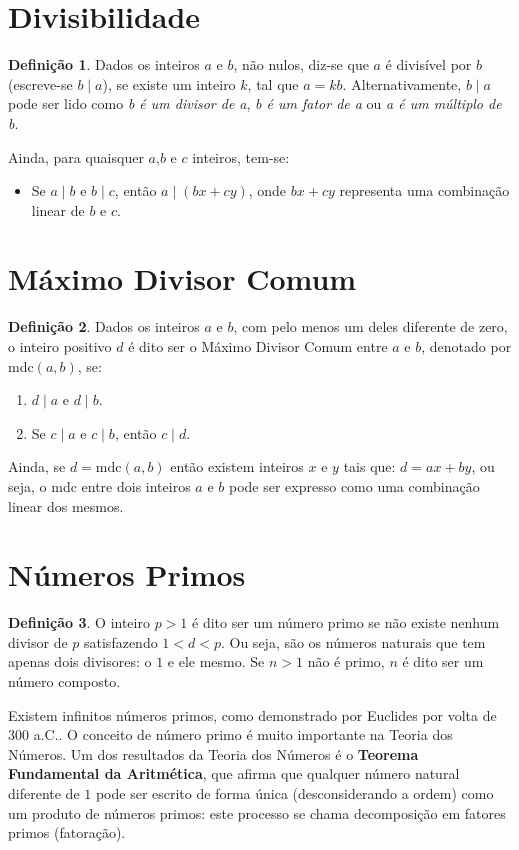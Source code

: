 \documentclass[14pt, oneside]{book}
\newcommand\tab[1][1cm]{\hspace*{#1}}
\theoremstyle{definition}
\newtheorem{defn}{Definição}
\begin{document}
            \section{Divisibilidade}
                \begin{defn}Dados os inteiros $a$ e $b$, não nulos, diz-se que $a$ é divisível por $b$ (escreve-se $b\mid a$), se existe um inteiro $k$, tal que $a = kb$. Alternativamente, $b\mid a$ pode ser lido como \textit{b é um divisor de a}, \textit{b é um fator de a} ou \textit{a é um múltiplo de b}.
                \end{defn}
                \tab Ainda, para quaisquer $a$,$b$ e $c$ inteiros, tem-se:
                \begin{itemize}
                    \item Se $a\mid b$ e $b\mid c$, então $a\mid (bx + cy)$, onde $bx + cy$ representa uma combinação linear de $b$ e $c$.
                \end{itemize}
                    
            \section{Máximo Divisor Comum}
                \begin{defn}Dados os inteiros $a$ e $b$, com pelo menos um deles diferente de zero, o inteiro positivo $d$ é dito ser o Máximo Divisor Comum entre $a$ e $b$, denotado por mdc$(a,b)$, se:
                \begin{enumerate}[label=(\roman*)]
                    \item $d\mid a$ e $d\mid b$.
                    \item Se $c\mid a$ e $c\mid b$, então $c\mid d$.
                \end{enumerate}
                \end{defn}
                \tab Ainda, se $d = \textrm{mdc}(a,b)$ então existem inteiros $x$ e $y$ tais que: $d = ax + by$, ou seja, o mdc entre dois inteiros $a$ e $b$ pode ser expresso como uma combinação linear dos mesmos.
                    
            \section{Números Primos}
                \begin{defn}O inteiro $p > 1$ é dito ser um número primo se não existe nenhum divisor de $p$ satisfazendo $1 < d < p$. Ou seja, são os números naturais que tem apenas dois divisores: o $1$ e ele mesmo. Se $n > 1$ não é primo, $n$ é dito ser um número composto.
                \end{defn}
                \tab Existem infinitos números primos, como demonstrado por Euclides por volta de $300$ a.C.. O conceito de número primo é muito importante na Teoria dos Números. Um dos resultados da Teoria dos Números é o \textbf{Teorema Fundamental da Aritmética}, que afirma que qualquer número natural diferente de $1$ pode ser escrito de forma única (desconsiderando a ordem) como um produto de números primos: este processo se chama decomposição em fatores primos (fatoração).
                    
\end{document}
